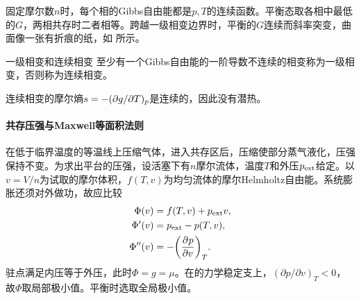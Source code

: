 固定摩尔数$n$时，每个相的Gibbs自由能都是$p,T$的连续函数。平衡态取各相中最低的$G$，两相共存时二者相等。跨越一级相变边界时，平衡的$G$连续而斜率突变，曲面像一张有折痕的纸，如 所示。

\begin{notecaptionblock}
	\label{fig:phase G-p-T}
\end{notecaptionblock}

\begin{definition}
	{一级相变和连续相变}{}
	至少有一个Gibbs自由能的一阶导数不连续的相变称为一级相变，否则称为连续相变。
\end{definition}

\begin{corollary}
	连续相变的摩尔熵$s = -(\partial g/\partial T)_p$是连续的，因此没有潜热。
\end{corollary}

\paragraph{共存压强与Maxwell等面积法则}

在低于临界温度的等温线上压缩气体，进入共存区后，压缩使部分蒸气液化，压强保持不变。为求出平台的压强，设活塞下有$n$摩尔流体，温度$T$和外压$p_{\rm ext}$给定。以$v = V/n$为试取的摩尔体积，$f(T,v)$为均匀流体的摩尔Helmholtz自由能。系统膨胀还须对外做功，故应比较
\begin{align*}
	\Phi(v) &= f(T,v) + p_{\rm ext}v,\\
	\Phi'(v) &= p_{\rm ext} - p(T,v),\\
	\Phi''(v) &= -\biggl(\frac{\partial^{}p}{\partial{v}^{}}\biggr)_{T}.
\end{align*}
驻点满足内压等于外压，此时$\Phi = g = \mu$。在的力学稳定支上，$(\partial p/\partial v)_T < 0$，故$\Phi$取局部极小值。平衡时选取全局极小值。

